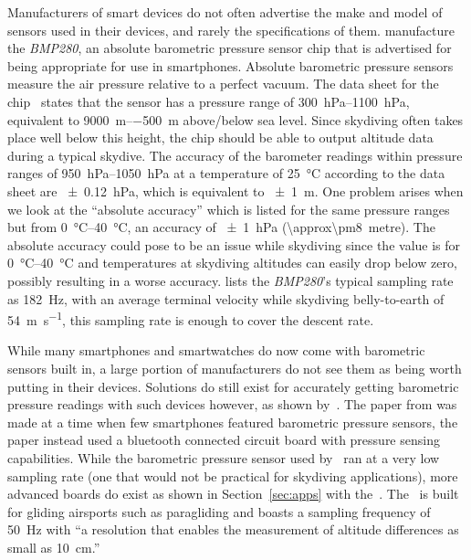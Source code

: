 \documentclass[twocolumn]{article}
\newcommand{\hPa}{\hecto\pascal} %
\begin{document}
Manufacturers of smart devices do not often advertise the make and model of sensors used in their devices, and rarely the specifications of them. \citeauthor{bosch_bmp280:_2016} manufacture the \textit{BMP280}, an absolute barometric pressure sensor chip that is advertised for being appropriate for use in smartphones. Absolute barometric pressure sensors measure the air pressure relative to a perfect vacuum. The data sheet for the chip~\cite{bosch_bmp280:_2016} states that the sensor has a pressure range of \SIrange{300}{1100}{\hPa}, equivalent to \SIrange{+9000}{-500}{\metre} above/below sea level. Since skydiving often takes place well below this height, the chip should be able to output altitude data during a typical skydive. The accuracy of the barometer readings within pressure ranges of \SIrange{950}{1050}{\hPa} at a temperature of \SI{25}{\degreeCelsius} according to the data sheet are \SI{\pm0.12}{\hPa}, which is equivalent to \SI{\pm1}{\metre}. One problem arises when we look at the ``absolute accuracy'' which is listed for the same pressure ranges but from \SIrange{0}{40}{\degreeCelsius}, an accuracy of \SI{\pm1}{\hPa} (\SI{\approx\pm8}{metre}). The absolute accuracy could pose to be an issue while skydiving since the value is for \SIrange{0}{40}{\degreeCelsius} and temperatures at skydiving altitudes can easily drop below zero, possibly resulting in a worse accuracy. \citeauthor{bosch_bmp280:_2016} lists the \textit{BMP280}'s typical sampling rate as \SI{182}{\Hz}, with an average terminal velocity while skydiving belly-to-earth of \SI{54}{\metre\per\second}, this sampling rate is enough to cover the descent rate.

While many smartphones and smartwatches do now come with barometric sensors built in, a large portion of manufacturers do not see them as being worth putting in their devices. Solutions do still exist for accurately getting barometric pressure readings with such devices however, as shown by~\textcite{he_atmospheric_2012}. The paper from \citeyear{he_atmospheric_2012} was made at a time when few smartphones featured barometric pressure sensors, the paper instead used a bluetooth connected circuit board with pressure sensing capabilities. While the barometric pressure sensor used by~\textcite{he_atmospheric_2012} ran at a very low sampling rate (one that would not be practical for skydiving applications), more advanced boards do exist as shown in Section~\ref{sec:apps} with the~.
The~ is built for gliding airsports such as paragliding and boasts a sampling frequency of \SI{50}{\Hz} with ``a resolution that enables the measurement of altitude differences as small as \SI{10}{\cm}.''
\end{document}
